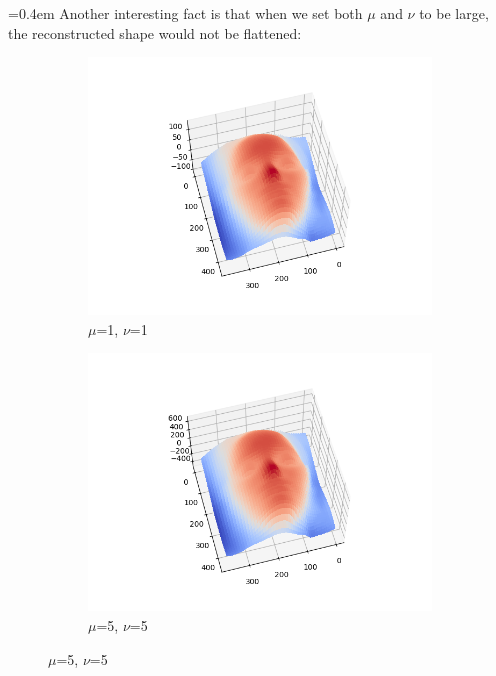 \documentclass{article}
\begin{document}
	\hangindent=0.4em \hspace{0.3em}Another interesting fact is that when we set both $\mu$ and $\nu$ to be large, the reconstructed shape would not be flattened:
\begin{figure}[H]	
	\begin{subfigure}{0.33\textwidth}
	\centering
	\includegraphics[width=\textwidth]{./src/2g_all_change/faceCalibrated_mu_1_v_1_lambda_1.png}
	\caption{$\mu$=1, $\nu$=1}
	\end{subfigure}
	\hfill
	\begin{subfigure}{0.32\textwidth}
	\centering
	\includegraphics[width=\textwidth]{./src/2g_all_change/faceCalibrated_mu_5_v_5_lambda_5.png}
	\caption{$\mu$=5, $\nu$=5}

\end{subfigure}
\end{figure}
\end{document}
